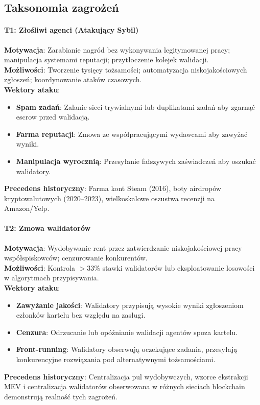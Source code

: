 \documentclass[11pt]{article}
\begin{document}
\subsection{Taksonomia zagrożeń}

\paragraph{T1: Złośliwi agenci (Atakujący Sybil)}
\textbf{Motywacja}: Zarabianie nagród bez wykonywania legitymowanej pracy; manipulacja systemami reputacji; przytłoczenie kolejek walidacji.\\
\textbf{Możliwości}: Tworzenie tysięcy tożsamości; automatyzacja niskojakościowych zgłoszeń; koordynowanie ataków czasowych.\\
\textbf{Wektory ataku}:
\begin{itemize}[noitemsep]
  \item \textbf{Spam zadań}: Zalanie sieci trywialnymi lub duplikatami zadań aby zgarnąć escrow przed walidacją.
  \item \textbf{Farma reputacji}: Zmowa ze współpracującymi wydawcami aby zawyżać wyniki.
  \item \textbf{Manipulacja wyrocznią}: Przesyłanie fałszywych zaświadczeń aby oszukać walidatory.
\end{itemize}
\textbf{Precedens historyczny}: Farma kont Steam (2016), boty airdropów kryptowalutowych (2020--2023), wielkoskalowe oszustwa recenzji na Amazon/Yelp.

\paragraph{T2: Zmowa walidatorów}
\textbf{Motywacja}: Wydobywanie rent przez zatwierdzanie niskojakościowej pracy współspiskowców; cenzurowanie konkurentów.\\
\textbf{Możliwości}: Kontrola $>33\%$ stawki walidatorów lub eksploatowanie losowości w algorytmach przypisywania.\\
\textbf{Wektory ataku}:
\begin{itemize}[noitemsep]
  \item \textbf{Zawyżanie jakości}: Walidatory przypisują wysokie wyniki zgłoszeniom członków kartelu bez względu na zasługi.
  \item \textbf{Cenzura}: Odrzucanie lub opóźnianie walidacji agentów spoza kartelu.
  \item \textbf{Front-running}: Walidatory obserwują oczekujące zadania, przesyłają konkurencyjne rozwiązania pod alternatywnymi tożsamościami.
\end{itemize}
\textbf{Precedens historyczny}: Centralizacja pul wydobywczych, wzorce ekstrakcji MEV i centralizacja walidatorów obserwowana w różnych sieciach blockchain demonstrują realność tych zagrożeń.
\end{document}
